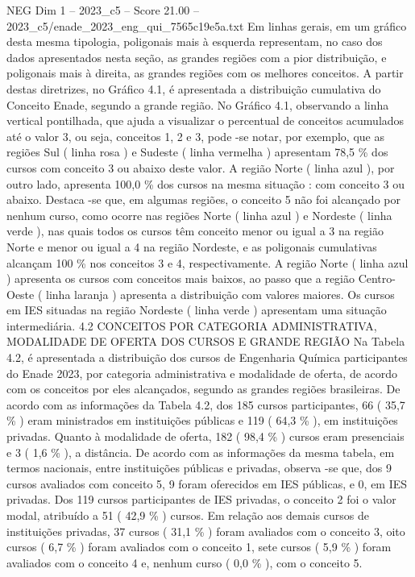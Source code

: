 \begin{textsample}{NEG Dim 1 – 2023\_c5 – Score 21.00 – 2023\_c5/enade\_2023\_eng\_qui\_7565c19e5a.txt}
Em linhas gerais, em um gráfico desta mesma tipologia, poligonais mais à esquerda representam, no caso dos dados apresentados nesta seção, as grandes regiões com a pior distribuição, e poligonais mais à direita, as grandes regiões com os melhores conceitos.
A partir destas diretrizes, no Gráfico 4.1, é apresentada a distribuição cumulativa do Conceito Enade, segundo a grande região.
No Gráfico 4.1, observando a linha vertical pontilhada, que ajuda a visualizar o percentual de conceitos acumulados até o valor 3, ou seja, conceitos 1, 2 e 3, pode -se notar, por exemplo, que as regiões Sul ( linha rosa ) e Sudeste ( linha vermelha ) apresentam 78,5 \% dos cursos com conceito 3 ou abaixo deste valor.
A região Norte ( linha azul ), por outro lado, apresenta 100,0 \% dos cursos na mesma situação : com conceito 3 ou abaixo.
Destaca -se que, em algumas regiões, o conceito 5 não foi alcançado por nenhum curso, como ocorre nas regiões Norte ( linha azul ) e Nordeste ( linha verde ), nas quais todos os cursos têm conceito menor ou igual a 3 na região Norte e menor ou igual a 4 na região Nordeste, e as poligonais cumulativas alcançam 100 \% nos conceitos 3 e 4, respectivamente.
A região Norte ( linha azul ) apresenta os cursos com conceitos mais baixos, ao passo que a região Centro-Oeste ( linha laranja ) apresenta a distribuição com valores maiores.
Os cursos em IES situadas na região Nordeste ( linha verde ) apresentam uma situação intermediária. 4.2 CONCEITOS POR CATEGORIA ADMINISTRATIVA, MODALIDADE DE OFERTA DOS CURSOS E GRANDE REGIÃO Na Tabela 4.2, é apresentada a distribuição dos cursos de Engenharia Química participantes do Enade 2023, por categoria administrativa e modalidade de oferta, de acordo com os conceitos por eles alcançados, segundo as grandes regiões brasileiras.
De acordo com as informações da Tabela 4.2, dos 185 cursos participantes, 66 ( 35,7 \% ) eram ministrados em instituições públicas e 119 ( 64,3 \% ), em instituições privadas.
Quanto à modalidade de oferta, 182 ( 98,4 \% ) cursos eram presenciais e 3 ( 1,6 \% ), a distância.
De acordo com as informações da mesma tabela, em termos nacionais, entre instituições públicas e privadas, observa -se que, dos 9 cursos avaliados com conceito 5, 9 foram oferecidos em IES públicas, e 0, em IES privadas.
Dos 119 cursos participantes de IES privadas, o conceito 2 foi o valor modal, atribuído a 51 ( 42,9 \% ) cursos.
Em relação aos demais cursos de instituições privadas, 37 cursos ( 31,1 \% ) foram avaliados com o conceito 3, oito cursos ( 6,7 \% ) foram avaliados com o conceito 1, sete cursos ( 5,9 \% ) foram avaliados com o conceito 4 e, nenhum curso ( 0,0 \% ), com o conceito 5.

\end{textsample}
